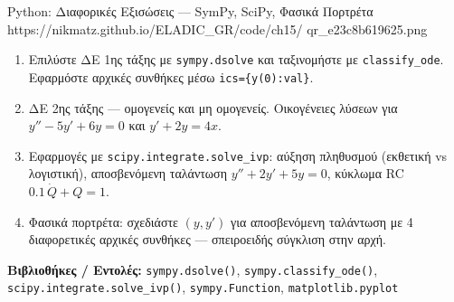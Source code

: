 \begin{pybox}{Python: Διαφορικές Εξισώσεις — SymPy, SciPy, Φασικά Πορτρέτα}%
             {https://nikmatz.github.io/ELADIC_GR/code/ch15/}%
             {qr_e23c8b619625.png}
\label{py:ch15_ode}
\begin{enumerate}[label=(\alph*),itemsep=2pt]
  \item Επιλύστε ΔΕ 1ης τάξης με \texttt{sympy.dsolve} και
    ταξινομήστε με \texttt{classify\_ode}.
    Εφαρμόστε αρχικές συνθήκες μέσω \texttt{ics=\{y(0):val\}}.
  \item ΔΕ 2ης τάξης — ομογενείς και μη ομογενείς.
    Οικογένειες λύσεων για $y''-5y'+6y=0$ και $y'+2y=4x$.
  \item Εφαρμογές με \texttt{scipy.integrate.solve\_ivp}:
    αύξηση πληθυσμού (εκθετική vs λογιστική),
    αποσβενόμενη ταλάντωση $y''+2y'+5y=0$,
    κύκλωμα RC $0.1\,\dot{Q}+Q=1$.
  \item Φασικά πορτρέτα: σχεδιάστε $(y, y')$ για
    αποσβενόμενη ταλάντωση με 4 διαφορετικές
    αρχικές συνθήκες — σπειροειδής σύγκλιση στην αρχή.
\end{enumerate}
\medskip
\textbf{Βιβλιοθήκες / Εντολές:}
\texttt{sympy.dsolve()}, \texttt{sympy.classify\_ode()},
\texttt{scipy.integrate.solve\_ivp()},
\texttt{sympy.Function}, \texttt{matplotlib.pyplot}
\end{pybox}
